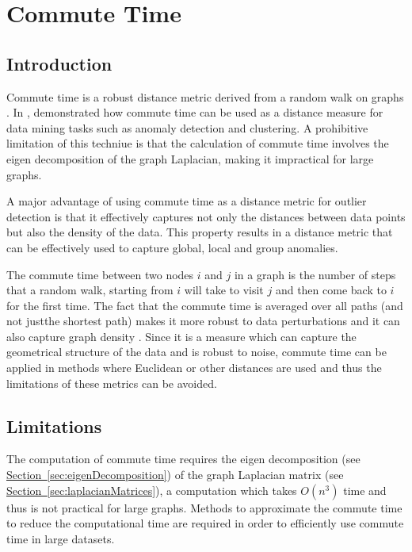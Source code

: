 \section{Commute Time}
\label{sec:commuteTime}

\subsection{Introduction}
\label{sec:commuteTimeIntroduction}
Commute time is a robust distance metric derived from a random walk on graphs 
\cite{Khoa:2012}. In , \citeauthor{Khoa:2012} demonstrated 
how commute time can be used as a distance measure for data mining tasks such as
anomaly detection and clustering. A prohibitive limitation of this techniue is 
that the calculation of commute time involves the eigen decomposition of the 
graph Laplacian, making it impractical for large graphs.

A major advantage of using commute time as a distance metric for outlier 
detection is that it effectively captures not only the distances between data 
points but also the density of the data. This property results in a distance 
metric that can be effectively used to capture global, local and group 
anomalies.

The commute time between two nodes $i$ and $j$ in a graph is the number of steps
that a random walk, starting from $i$ will take to visit $j$ and then come back 
to $i$ for the first time. The fact that the commute time is averaged over all 
paths (and not justthe shortest path) makes it more robust to data perturbations
and it can also capture graph density \cite{Khoa:2012}. Since it is a measure 
which can capture the geometrical structure of the data and is robust to noise, 
commute time can be applied in methods where Euclidean or other distances are 
used and thus the limitations of these metrics can be avoided.

\subsection{Limitations}
\label{sec:commuteTime:limitations}
The computation of commute time requires the eigen decomposition (see 
\hyperref[sec:eigenDecomposition] {Section~\ref{sec:eigenDecomposition}}) of the
graph Laplacian matrix (see \hyperref[sec:laplacianMatrices] 
{Section~\ref{sec:laplacianMatrices}}), a computation which takes $O(n^{3})$ 
time and thus is not practical for large graphs. Methods to approximate the 
commute time to reduce the computational time are required in order to 
efficiently use commute time in large datasets.

